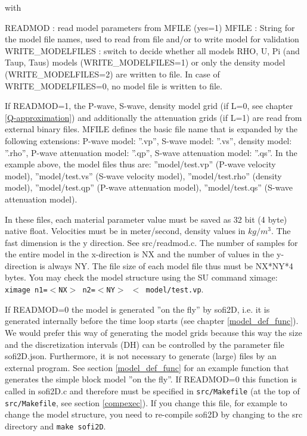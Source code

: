 \documentclass[11pt,onecolumn,oneside]{article}
\begin{document}
with

READMOD : read model parameters from MFILE (yes=1)\newline
MFILE : String for the model file names, used to read from file and/or to write model for validation \newline
WRITE\_MODELFILES : switch to decide whether all models RHO, U, Pi (and Taup, Taus) models (WRITE\_MODELFILES=1) or only the density model (WRITE\_MODELFILES=2) are written to file. In case of WRITE\_MODELFILES=0, no model file is written to file. \newline

If READMOD=1, the P-wave, S-wave, density model grid (if L=0, see chapter \ref{Q-approximation}) and additionally the attenuation grids (if L=1) are read from external binary files. MFILE defines the basic file name that is expanded by the following extensions: P-wave model: ''.vp'', S-wave model: ''.vs'', density model: ''.rho'', P-wave attenuation model: ''.qp'', S-wave attenuation model: ''.qs''.  In the example above, the model files thus are: ''model/test.vp'' (P-wave velocity model), ''model/test.vs'' (S-wave velocity model), ''model/test.rho'' (density model), ''model/test.qp'' (P-wave attenuation model), ''model/test.qs'' (S-wave attenuation model). 

In these files, each material parameter value must be saved as 32 bit (4 byte) native float. Velocities must be in meter/second, density values in $kg/m^3$. The fast dimension is the y direction. See src/readmod.c. The number of samples for the entire model in the x-direction is NX and the number of values in the y-direction is always NY. The file size of each model file thus must be NX*NY*4 bytes. You may check the model structure using the SU command ximage: \texttt{ximage n1=$<$NX$>$ n2=$<$NY$>$ $<$ model/test.vp}.

If READMOD=0 the model is generated ''on the fly'' by sofi2D, i.e. it is generated internally before the time loop starts (see chapter \ref{model_def_func}). We would prefer this way of generating the model grids because this way the size and the discretization intervals (DH) can be controlled by the parameter file sofi2D.json. Furthermore, it is not necessary to generate (large) files by an external program. See section \ref{model_def_func} for an example function that generates the simple block model ''on the fly''. If READMOD=0 this function is called in sofi2D.c and therefore must be specified in \texttt{src/Makefile} (at the top of \texttt{src/Makefile}, see section \ref{compexec}). If you change this file, for example to change the model structure, you need to re-compile sofi2D by changing to the src directory and \texttt{make sofi2D}.
\end{document}
